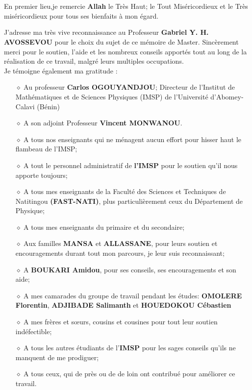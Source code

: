 \documentclass[12pt,a4paper, openany]{report}
\begin{document}
\chapter*{\color{green!30!blue}{Remerciements}}
En premier lieu,je remercie {\bfseries Allah} le Très Haut; le Tout Miséricordieux et le Très miséricordieux pour tous ses bienfaits à mon égard. \par
J'adresse ma très vive reconnaissance au Professeur {\bfseries Gabriel Y. H. \\  AVOSSEVOU} pour le choix du sujet de ce mémoire de Master. Sincèrement merci pour le soutien, l'aide et les nombreux conseils apportés tout au long de la réalisation de ce travail, malgré leurs multiples occupations.\\Je témoigne également ma gratitude :
\begin{flushleft}
	\begin{enumerate}
		\item [$\diamond$] Au professeur {\bfseries Carlos  OGOUYANDJOU}; Directeur de l'Institut de Mathématiques et de Sciences  Physiques  (IMSP) de l'Université d'Abomey-Calavi  (Bénin)
		\item [$\diamond$] A son adjoint Professeur {\bfseries Vincent  MONWANOU}.
		\item [$\diamond$] A tous nos enseignants qui ne ménagent aucun effort pour hisser haut le flambeau de l'IMSP;
		\item [$\diamond$] A tout le personnel administratif de {\bfseries  l'IMSP} pour le soutien qu'il nous apporte toujours;
		\item [$\diamond$] A tous mes enseignants  de la Faculté des Sciences et Techniques de Natitingou  {\bfseries(FAST-NATI)}, plus particulièrement ceux du Département de Physique;
		\item [$\diamond$] A tous mes enseignants du primaire et du secondaire;
		\item [$\diamond$] Aux familles {\bfseries MANSA}  et {\bfseries ALLASSANE}, pour leurs soutien et encouragements durant tout mon parcours, je leur suis reconnaissant;
		\item [$\diamond$] A {\bfseries BOUKARI Amidou}, pour ses conseils, ses encouragements et son aide;
		\item [$\diamond$] A mes camarades du groupe de travail pendant les études: {\bfseries OMOLERE Florentin}, {\bfseries ADJIBADE Salimanth} et {\bfseries HOUEDOKOU Cébastien}
		\item [$\diamond$] A mes frères et s\oe{}urs, cousins et cousines pour tout leur soutien indéfectible;
		\item [$\diamond$] A tous les autres étudiants de l'{\bfseries IMSP} pour les sages conseils qu'ils ne manquent de me prodiguer;
		\item [$\diamond$] A tous ceux, qui de près ou de de loin ont contribué pour améliorer ce travail.
		
	\end{enumerate}
\end{flushleft}
\end{document}
